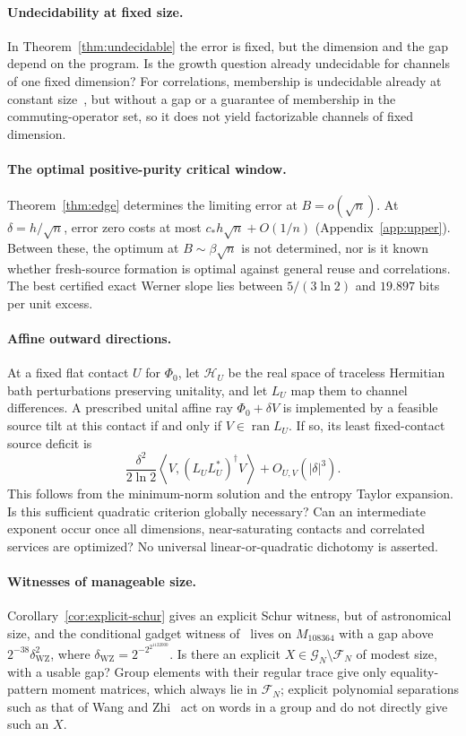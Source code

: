 \documentclass[11pt]{article}
\theoremstyle{definition}
\theoremstyle{remark}
\newcommand{\G}{\mathcal G}
\newcommand{\Fm}{\mathcal F}
\begin{document}
\paragraph{Undecidability at fixed size.}
In Theorem~\ref{thm:undecidable} the error is fixed, but the dimension and the gap depend on the program. Is the growth question already undecidable for channels of one fixed dimension? For correlations, membership is undecidable already at constant size~\cite{FuMillerSlofstra}, but without a gap or a guarantee of membership in the commuting-operator set, so it does not yield factorizable channels of fixed dimension.

\paragraph{The optimal positive-purity critical window.}
Theorem~\ref{thm:edge} determines the limiting error at $B=o(\sqrt n)$. At $\delta=h/\sqrt n$, error zero costs at most $c_*h\sqrt n+O(1/n)$ (Appendix~\ref{app:upper}). Between these, the optimum at $B\sim\beta\sqrt n$ is not determined, nor is it known whether fresh-source formation is optimal against general reuse and correlations. The best certified exact Werner slope lies between $5/(3\ln2)$ and $19.897$ bits per unit excess.

\paragraph{Affine outward directions.}
At a fixed flat contact $U$ for $\Phi_0$, let $\mathcal H_U$ be the real space of traceless Hermitian bath perturbations preserving unitality, and let $L_U$ map them to channel differences. A prescribed unital affine ray $\Phi_0+\delta V$ is implemented by a feasible source tilt at this contact if and only if $V\in\operatorname{ran}L_U$. If so, its least fixed-contact source deficit is
\[
 \frac{\delta^2}{2\ln2}\left\langle V,(L_UL_U^*)^\dagger V\right\rangle
 +O_{U,V}(|\delta|^3).
\]
This follows from the minimum-norm solution and the entropy Taylor expansion. Is this sufficient quadratic criterion globally necessary? Can an intermediate exponent occur once all dimensions, near-saturating contacts and correlated services are optimized? No universal linear-or-quadratic dichotomy is asserted.

\paragraph{Witnesses of manageable size.}
Corollary~\ref{cor:explicit-schur} gives an explicit Schur witness, but of astronomical size, and the conditional gadget witness of~\cite[Proposition~5.5]{Law} lives on $M_{108364}$ with a gap above $2^{-38}\delta_{\mathrm{WZ}}^2$, where $\delta_{\mathrm{WZ}}=2^{-2^{2^{1122000}}}$. Is there an explicit $X\in\G_N\setminus\Fm_N$ of modest size, with a usable gap? Group elements with their regular trace give only equality-pattern moment matrices, which always lie in $\Fm_N$; explicit polynomial separations such as that of Wang and Zhi~\cite{WangZhi} act on words in a group and do not directly give such an $X$.
\end{document}
